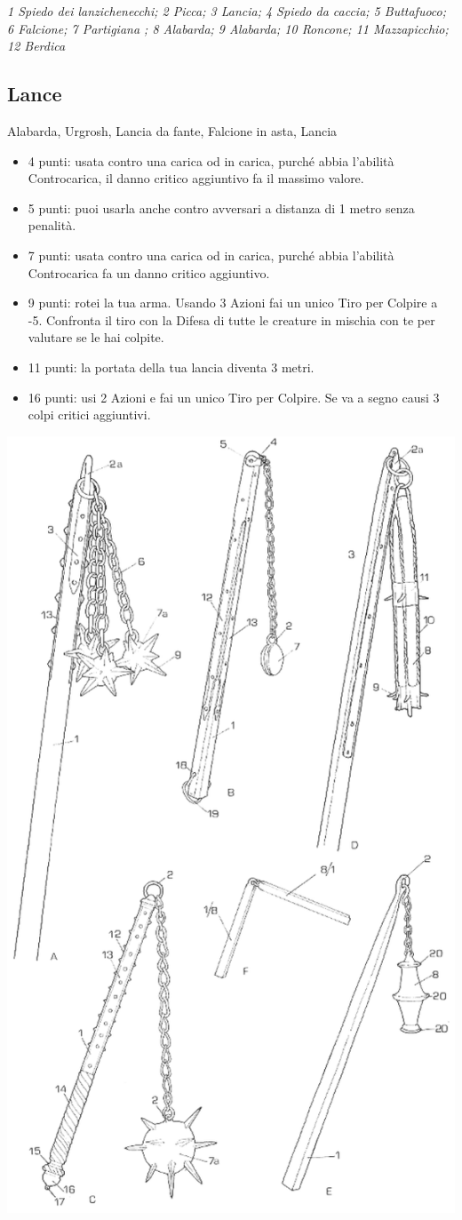 \begin{multicols}{2}
\begin{center}
	\emph{1 Spiedo dei lanzichenecchi; 2 Picca; 3 Lancia; 4 Spiedo da caccia; 5 Buttafuoco; 6 Falcione; 7 Partigiana ; 8 Alabarda; 9 Alabarda; 10 Roncone; 11 Mazzapicchio; 12 Berdica}
\end{center}

\subsection{Lance} Alabarda, Urgrosh, Lancia da fante, Falcione in asta, Lancia

\begin{itemize}[leftmargin=*] \setlength{\itemsep}{0pt}
\item 4 punti: usata contro una carica od in carica, purché abbia l'abilità Controcarica, il danno critico aggiuntivo fa il massimo valore.
\item 5 punti: puoi usarla anche contro avversari a distanza di 1 metro senza penalità.
\item 7 punti: usata contro una carica od in carica, purché abbia l'abilità Controcarica fa un danno critico aggiuntivo.
\item 9 punti: rotei la tua arma. Usando 3 Azioni fai un unico Tiro per Colpire a -5. Confronta il tiro con la Difesa di tutte le creature in mischia con te per valutare se le hai colpite.
\item 11 punti: la portata della tua lancia diventa 3 metri.
\item 16 punti: usi 2 Azioni e fai un unico Tiro per Colpire. Se va a segno causi 3 colpi critici aggiuntivi.
\end{itemize}

\begin{center}
	\includegraphics[width=0.5\linewidth]{immagini/mazzafrusto.png}
\end{center}


\end{multicols}
